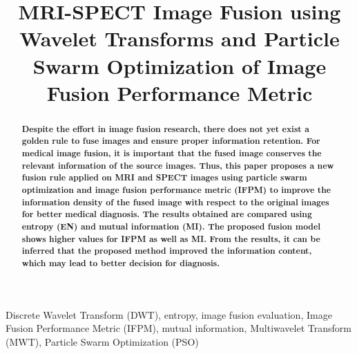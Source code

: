 \documentclass{article}
\title{MRI-SPECT Image Fusion using Wavelet Transforms and Particle Swarm Optimization of Image Fusion Performance Metric}
\begin{document}
%
\maketitle

\begin{abstract}
\ninept
\textbf{
Despite the effort in image fusion research, there does not yet exist a golden rule to fuse images and ensure proper information retention. For medical image fusion, it is important that the fused image conserves the relevant information of the source images.
Thus, this paper proposes a new fusion rule applied on MRI and SPECT images using particle swarm optimization and image fusion performance metric (IFPM) to improve the information density of the fused image with respect to the original images for better medical diagnosis. The results obtained are compared using entropy (EN) and mutual information (MI).
The proposed fusion model shows higher values for IFPM as well as MI. From the results, it can be inferred that the proposed method improved the information content, which may lead to better decision for diagnosis.} 
\end{abstract}
%
\begin{keywords}
\ninept
Discrete Wavelet Transform (DWT), entropy, image fusion evaluation, Image Fusion Performance Metric (IFPM), mutual information, Multiwavelet Transform (MWT), Particle Swarm Optimization (PSO)
\end{keywords} 
%
\end{document}
